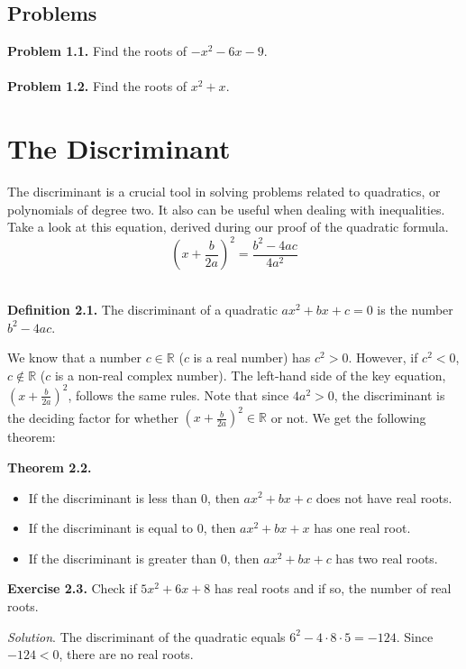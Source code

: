 \documentclass{article}
\begin{document}
\subsection{Problems}
\textbf{Problem 1.1.} Find the roots of $-x^2-6x-9$.\\\\
\textbf{Problem 1.2.} Find the roots of $x^2+x$.


\section{The Discriminant}
The discriminant is a crucial tool in solving problems related to quadratics, or polynomials of degree two. It also can be useful when dealing with inequalities.\\

Take a look at this equation, derived during our proof of the quadratic formula.
$$(x+\frac{b}{2a})^2=\frac{b^2-4ac}{4a^2}$$\\

\begin{mdframed}
  \textbf{Definition 2.1.} The discriminant of a quadratic $ax^2+bx+c=0$ is the number $b^2-4ac$.
\end{mdframed}

We know that a number $c \in \mathbb{R}$ ($c$ is a real number) has $c^2>0$. However, if $c^2<0$, $c \not\in \mathbb{R}$ ($c$ is a non-real complex number). The left-hand side of the key equation, $(x+\frac{b}{2a})^2$, follows the same rules. Note that since $4a^2 > 0$, the discriminant is the deciding factor for whether $(x+\frac{b}{2a})^2 \in \mathbb{R}$ or not. We get the following theorem:\\

\begin{mdframed}
    \textbf{Theorem 2.2.}
    \begin{itemize}
        \item If the discriminant is less than 0, then $ax^2+bx+c$ does not have real roots.
        \item If the discriminant is equal to 0, then $ax^2+bx+x$ has one real root.
        \item If the discriminant is greater than 0, then $ax^2+bx+c$ has two real roots.
    \end{itemize}
\end{mdframed}

\begin{mdframed}
  \textbf{Exercise 2.3.} Check if $5x^2+6x+8$ has real roots and if so, the number of real roots.
\end{mdframed}
\emph{Solution}. The discriminant of the quadratic equals $6^2-4\cdot8\cdot5 = -124$. Since $-124 < 0$, there are no real roots.
\end{document}
